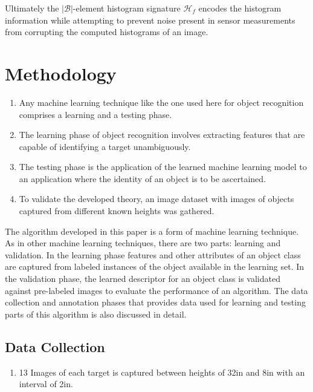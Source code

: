 \documentclass {udthesis}
\begin{document}
Ultimately the $|\mathcal{B}|$-element histogram signature $\mathcal{H}_f$ encodes the histogram information while attempting to prevent noise present in sensor measurements from corrupting the computed histograms of an image.

\section{Methodology}
\label{sec:methodology}

\begin{enumerate}
	\item Any machine learning technique like the one used here for object recognition comprises a learning and a testing phase.
	
	\item The learning phase of object recognition involves extracting features that are capable of identifying a target unambiguously.
	
	\item The testing phase is the application of the learned machine learning model to an application where the identity of an object is to be ascertained.
	
	\item To validate the developed theory, an image dataset with images of objects captured from different known heights was gathered.
\end{enumerate}	


The algorithm developed in this paper is a form of machine learning technique. As in other machine learning techniques, there are two parts: learning and validation. In the learning phase features and other attributes of an object class are captured from labeled instances of the object available in the learning set. In the validation phase, the learned descriptor for an object class is validated against pre-labeled images to evaluate the performance of an algorithm. The data collection and annotation phases that provides data used for learning and testing parts of this algorithm is also discussed in detail.

\subsection{Data Collection}


\begin{enumerate}
  \item 13 Images of each target is captured between heights of 32in and 8in with an interval of 2in.
\end{enumerate}	
\end{document}
